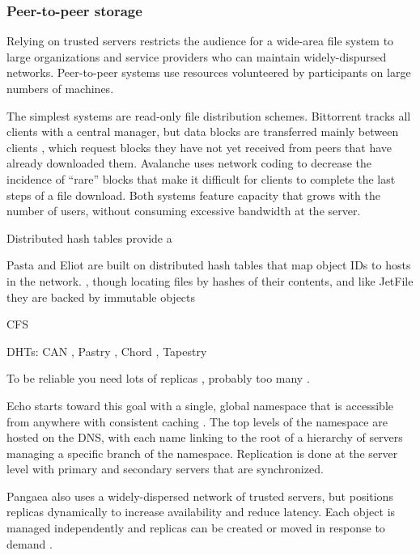 \subsubsection{Peer-to-peer storage}

Relying on trusted servers restricts the audience for a wide-area file system to large organizations and service providers who can maintain widely-dispursed networks. Peer-to-peer systems use resources volunteered by participants on large numbers of machines.

The simplest systems are read-only file distribution schemes. Bittorrent tracks all clients with a central manager, but data blocks are transferred mainly between clients \cite{cohen,pouwelse}, which request blocks they have not yet received from peers that have already downloaded them. Avalanche \cite{gkantsidis} uses network coding to decrease the incidence of ``rare'' blocks that make it difficult for clients to complete the last steps of a file download. Both systems feature capacity that grows with the number of users, without consuming excessive bandwidth at the server.

Distributed hash tables provide a 

Pasta \cite{moreton} and Eliot \cite{stein02} are built on distributed hash tables that map object IDs to hosts in the network. , though locating files by hashes of their contents, and like JetFile \cite{gronvall} they are backed by immutable objects

CFS \cite{dabek}

DHTs: CAN \cite{ratnasamy}, Pastry \cite{rowstron}, Chord \cite{stoica}, Tapestry \cite{zhao01}

To be reliable you need lots of replicas \cite{rabin}, probably too many \cite{blake}.


Echo starts toward this goal with a single, global namespace that is accessible from anywhere with consistent caching \cite{birrell93,mann}. The top levels of the namespace are hosted on the DNS, with each name linking to the root of a hierarchy of servers managing a specific branch of the namespace. Replication is done at the server level with primary and secondary servers that are synchronized.

Pangaea \cite{saito02b} also uses a widely-dispersed network of trusted servers, but positions replicas dynamically to increase availability and reduce latency. Each object is managed independently and replicas can be created or moved in response to demand \cite{saito02a}.


